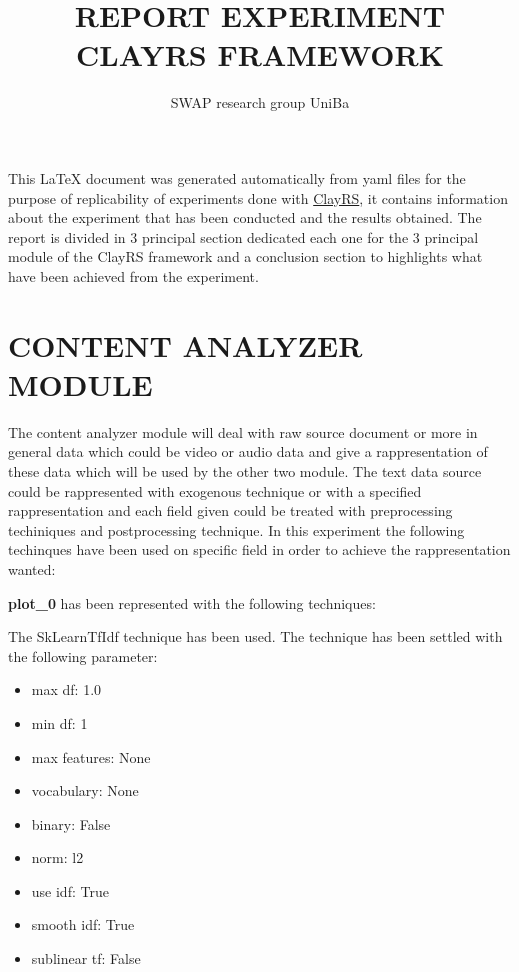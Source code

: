 \documentclass[11pt]{article}
\title{REPORT EXPERIMENT CLAYRS FRAMEWORK}
\author{SWAP research group UniBa}
\begin{document}
\maketitle
This \LaTeX{} document was generated automatically from yaml files for the purpose of replicability of experiments done with
\href{https://github.com/swapUniba/ClayRS}{ClayRS},
it contains information about the experiment that has been conducted and the results obtained.
The report is divided in 3 principal section dedicated each one for the 3 principal module of the ClayRS framework
and a conclusion section to highlights what have been achieved from the experiment.
\hfill\break
\hfill\break



\section{CONTENT ANALYZER MODULE}\label{sec:ca}
The content analyzer module will deal with raw source document or more in general data which could be
video or audio data and give a rappresentation of these data which will be used by the other two module.
The text data source could be rappresented with exogenous technique or with a specified rappresentation
and each field given could be treated with preprocessing techiniques and postprocessing technique. In
this experiment the following techinques have been used on specific field in order to achieve the
rappresentation wanted:
\hfill\break
\hfill\break



\textbf{plot_0} has been represented with the following techniques:
\hfill\break
\hfill\break



The SkLearnTfIdf technique has been used.
The technique has been settled with the following parameter:
\begin{itemize}
    \item max df: 1.0
    \item min df: 1
    \item max features: None
    \item vocabulary: None
    \item binary: False
    \item norm: l2
    \item use idf: True
    \item smooth idf: True
    \item sublinear tf: False
\end{itemize}
\hfill\break
\hfill\break
\end{document}
